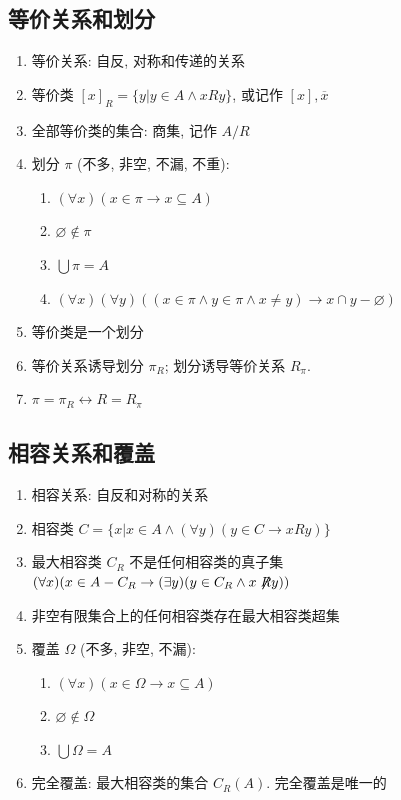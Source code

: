 \documentclass[11pt,a4paper,twocolumn,fleqn]{article} %
\renewcommand{\emptyset}{\varnothing}
\begin{document}
\subsection{等价关系和划分} %
\label{sub:equivalent}
\begin{enumerate}
	\item 等价关系: 自反, 对称和传递的关系
	\item 等价类 $[x]_R = \{y|y\in A \land x R y\}$, 或记作 $[x], \overline x$
	\item 全部等价类的集合: 商集, 记作 $A/R$
	\item 划分 $\pi$ (不多, 非空, 不漏, 不重): 
	\begin{enumerate}
		\item $(\forall x)(x\in \pi \to x\subseteq A)$
		\item $\emptyset \notin \pi$
		\item $\bigcup \pi = A$
		\item $(\forall x)(\forall y)((x\in \pi \land y\in \pi \land x\neq y)
		\to x\cap y - \emptyset)$
	\end{enumerate}
	\item 等价类是一个划分
	\item 等价关系诱导划分 $\pi_R$; 划分诱导等价关系 $R_\pi$. 
	\item $\pi = \pi_R \leftrightarrow R = R_\pi$
\end{enumerate}
\subsection{相容关系和覆盖} %
\label{sub:compatibility}
\begin{enumerate}
	\item 相容关系: 自反和对称的关系
	\item 相容类 $C = \{x|x\in A\land (\forall y)(y \in C \to x R y)\}$
	\item 最大相容类 $C_R$ 不是任何相容类的真子集\\
	$(\forall x)(x\in A - C_R \to (\exists y)(y\in C_R \land 
	x\not\not\negthickspace{R} y))$
	\item 非空有限集合上的任何相容类存在最大相容类超集
	\item 覆盖 $\Omega$ (不多, 非空, 不漏):
	\begin{enumerate}
		\item $(\forall x)(x\in \Omega \to x\subseteq A)$
		\item $\emptyset \notin \Omega$
		\item $\bigcup \Omega = A$
	\end{enumerate}
	\item 完全覆盖: 最大相容类的集合 $C_R(A)$. 完全覆盖是唯一的
\end{enumerate}
\end{document}
